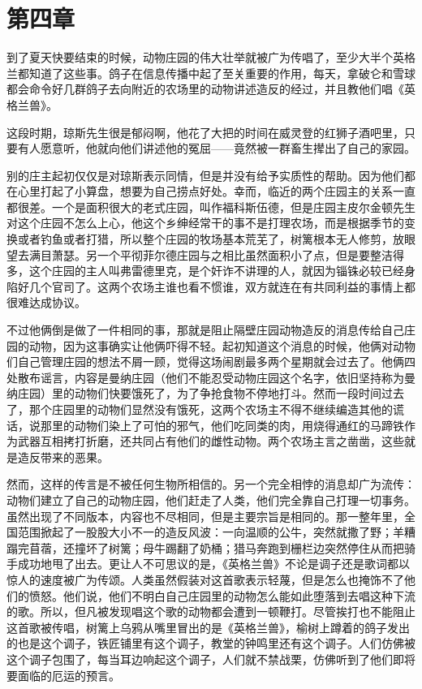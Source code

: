 \chapter{第四章}

到了夏天快要结束的时候，动物庄园的伟大壮举就被广为传唱了，至少大半个英格兰都知道了这些事。鸽子在信息传播中起了至关重要的作用，每天，拿破仑和雪球都会命令好几群鸽子去向附近的农场里的动物讲述造反的经过，并且教他们唱《英格兰兽》。

这段时期，琼斯先生很是郁闷啊，他花了大把的时间在威灵登的红狮子酒吧里，只要有人愿意听，他就向他们讲述他的冤屈——竟然被一群畜生撵出了自己的家园。

别的庄主起初仅仅是对琼斯表示同情，但是并没有给予实质性的帮助。因为他们都在心里打起了小算盘，想要为自己捞点好处。幸而，临近的两个庄园主的关系一直都很差。一个是面积很大的老式庄园，叫作福科斯伍德，但是庄园主皮尔金顿先生对这个庄园不怎么上心，他这个乡绅经常干的事不是打理农场，而是根据季节的变换或者钓鱼或者打猎，所以整个庄园的牧场基本荒芜了，树篱根本无人修剪，放眼望去满目萧瑟。另一个平彻菲尔德庄园与之相比虽然面积小了点，但是要整洁得多，这个庄园的主人叫弗雷德里克，是个奸诈不讲理的人，就因为锱铢必较已经身陷好几个官司了。这两个农场主谁也看不惯谁，双方就连在有共同利益的事情上都很难达成协议。

不过他俩倒是做了一件相同的事，那就是阻止隔壁庄园动物造反的消息传给自己庄园的动物，因为这事确实让他俩吓得不轻。起初知道这个消息的时候，他俩对动物们自己管理庄园的想法不屑一顾，觉得这场闹剧最多两个星期就会过去了。他俩四处散布谣言，内容是曼纳庄园（他们不能忍受动物庄园这个名字，依旧坚持称为曼纳庄园）里的动物们快要饿死了，为了争抢食物不停地打斗。然而一段时间过去了，那个庄园里的动物们显然没有饿死，这两个农场主不得不继续编造其他的谎话，说那里的动物们染上了可怕的邪气，他们吃同类的肉，用烧得通红的马蹄铁作为武器互相拷打折磨，还共同占有他们的雌性动物。两个农场主言之凿凿，这些就是造反带来的恶果。

然而，这样的传言是不被任何生物所相信的。另一个完全相悖的消息却广为流传：动物们建立了自己的动物庄园，他们赶走了人类，他们完全靠自己打理一切事务。虽然出现了不同版本，内容也不尽相同，但是主要宗旨是相同的。那一整年里，全国范围掀起了一股股大小不一的造反风波：一向温顺的公牛，突然就撒了野；羊糟蹋完苜蓿，还撞坏了树篱；母牛踢翻了奶桶；猎马奔跑到栅栏边突然停住从而把骑手成功地甩了出去。更让人不可思议的是，《英格兰兽》不论是调子还是歌词都以惊人的速度被广为传颂。人类虽然假装对这首歌表示轻蔑，但是怎么也掩饰不了他们的愤怒。他们说，他们不明白自己庄园里的动物怎么能如此堕落到去唱这种下流的歌。所以，但凡被发现唱这个歌的动物都会遭到一顿鞭打。尽管挨打也不能阻止这首歌被传唱，树篱上乌鸦从嘴里冒出的是《英格兰兽》，榆树上蹲着的鸽子发出的也是这个调子，铁匠铺里有这个调子，教堂的钟鸣里还有这个调子。人们仿佛被这个调子包围了，每当耳边响起这个调子，人们就不禁战栗，仿佛听到了他们即将要面临的厄运的预言。

